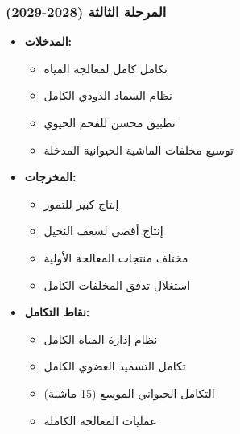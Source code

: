 \subsubsection{المرحلة الثالثة (2028-2029)}
\begin{itemize}
    \item \textbf{المدخلات:}
    \begin{itemize}
        \item تكامل كامل لمعالجة المياه
        \item نظام السماد الدودي الكامل
        \item تطبيق محسن للفحم الحيوي
        \item توسيع مخلفات الماشية الحيوانية المدخلة
    \end{itemize}
    \item \textbf{المخرجات:}
    \begin{itemize}
        \item إنتاج كبير للتمور
        \item إنتاج أقصى لسعف النخيل
        \item مختلف منتجات المعالجة الأولية
        \item استغلال تدفق المخلفات الكامل
    \end{itemize}
    \item \textbf{نقاط التكامل:}
    \begin{itemize}
        \item نظام إدارة المياه الكامل
        \item تكامل التسميد العضوي الكامل
        \item التكامل الحيواني الموسع (15 ماشية)
        \item عمليات المعالجة الكاملة
    \end{itemize}
\end{itemize}


